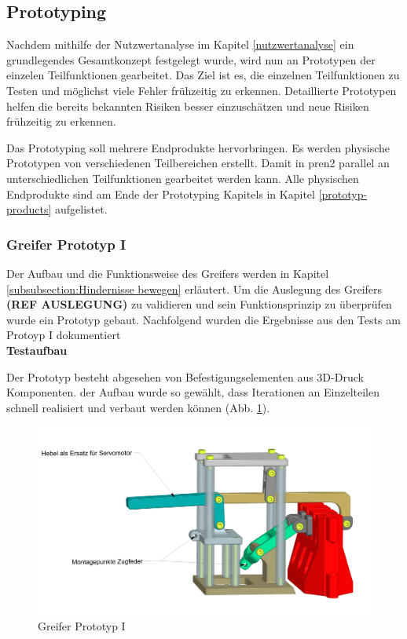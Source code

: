 \subsection{Prototyping}

Nachdem mithilfe der Nutzwertanalyse im Kapitel \ref{nutzwertanalyse} ein grundlegendes Gesamtkonzept festgelegt wurde, wird nun an Prototypen der einzelen Teilfunktionen gearbeitet. Das Ziel ist es, die einzelnen Teilfunktionen zu Testen und möglichst viele Fehler frühzeitig zu erkennen. Detaillierte Prototypen helfen die bereits bekannten Risiken besser einzuschätzen und neue Risiken frühzeitig zu erkennen.

Das Prototyping soll mehrere Endprodukte hervorbringen. Es werden physische Prototypen von verschiedenen Teilbereichen erstellt. Damit in \acrshort{pren2} parallel an unterschiedlichen Teilfunktionen gearbeitet werden kann. Alle physischen Endprodukte sind am Ende der Prototyping Kapitels in Kapitel \ref{prototyp-products} aufgelistet.

\subsubsection{Greifer Prototyp I}
\label{subsubsection:gripper-prototype-1}


Der Aufbau und die Funktionsweise des Greifers werden in Kapitel \ref{subsubsection:Hindernisse bewegen} erläutert. Um die Auslegung des Greifers \textbf{(REF AUSLEGUNG)} zu validieren und sein Funktionsprinzip zu überprüfen wurde ein Prototyp gebaut. Nachfolgend wurden die Ergebnisse aus den Tests am Protoyp I dokumentiert\\

\textbf{Testaufbau}

 Der Prototyp besteht abgesehen von Befestigungselementen aus 3D-Druck Komponenten. der Aufbau wurde so gewählt, dass Iterationen an Einzelteilen schnell realisiert und verbaut werden können (Abb. \ref{fig:gripper-prototype-1-trimetric-notes}). 

\begin{figure}[H]
\centering
\includegraphics[width=1.0\textwidth]{assets/greifer-prototyp/Greifer_Trimetrisch_Notes.png}
\caption{Greifer Prototyp I}
\label{fig:gripper-prototype-1-trimetric-notes}
\end{figure}


